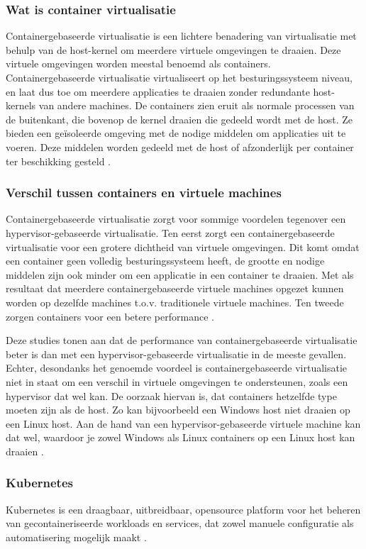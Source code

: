 \subsubsection{Wat is container virtualisatie}

Containergebaseerde virtualisatie is een lichtere benadering van virtualisatie met behulp van de host-kernel om meerdere virtuele omgevingen te draaien. Deze virtuele omgevingen worden meestal benoemd als containers. Containergebaseerde virtualisatie virtualiseert op het besturingssysteem niveau, en laat dus toe om meerdere applicaties te draaien zonder redundante host-kernels van andere machines. De containers zien eruit als normale processen van de buitenkant, die bovenop de kernel draaien die gedeeld wordt met de host. Ze bieden een geïsoleerde omgeving met de nodige middelen om applicaties uit te voeren. Deze middelen worden gedeeld met de host of afzonderlijk per container ter beschikking gesteld \autocite{Thanh2015}.

\subsubsection{Verschil tussen containers en virtuele machines}
Containergebaseerde virtualisatie zorgt voor sommige voordelen tegenover een hypervisor-gebaseerde virtualisatie. Ten eerst zorgt een containergebaseerde virtualisatie voor een grotere dichtheid van virtuele omgevingen. Dit komt omdat een container geen volledig besturingssysteem heeft, de grootte en nodige middelen zijn ook minder om een applicatie in een container te draaien. Met als resultaat dat meerdere containergebaseerde virtuele machines opgezet kunnen worden op dezelfde machines t.o.v. traditionele virtuele machines. Ten tweede zorgen containers voor een betere performance \autocite{Ruiz2015}.

Deze studies tonen aan dat de performance van containergebaseerde virtualisatie beter is dan met een hypervisor-gebaseerde virtualisatie in de meeste gevallen. Echter, desondanks het genoemde voordeel is containergebaseerde virtualisatie niet in staat om een verschil in virtuele omgevingen te ondersteunen, zoals een hypervisor dat wel kan. De oorzaak hiervan is, dat containers hetzelfde type moeten zijn als de host. Zo kan bijvoorbeeld een Windows host niet draaien op een Linux host. Aan de hand van een hypervisor-gebaseerde virtuele machine kan dat wel, waardoor je zowel Windows als Linux containers op een Linux host kan draaien \autocite{Ruiz2015}.

\subsubsection{Kubernetes}
Kubernetes is een draagbaar, uitbreidbaar, opensource platform voor het beheren van gecontaineriseerde workloads en services, dat zowel manuele configuratie als automatisering mogelijk maakt \autocite{Kubernetes2021}.


